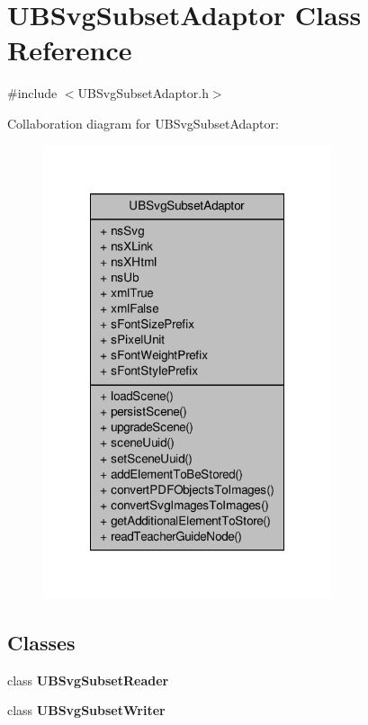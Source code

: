 \hypertarget{class_u_b_svg_subset_adaptor}{\section{U\-B\-Svg\-Subset\-Adaptor Class Reference}
\label{d3/df9/class_u_b_svg_subset_adaptor}
}


{\ttfamily \#include $<$U\-B\-Svg\-Subset\-Adaptor.\-h$>$}



Collaboration diagram for U\-B\-Svg\-Subset\-Adaptor\-:
\nopagebreak
\begin{figure}[H]
\begin{center}
\leavevmode
\includegraphics[width=240pt]{d2/ddc/class_u_b_svg_subset_adaptor__coll__graph}
\end{center}
\end{figure}
\subsection*{Classes}
\begin{DoxyCompactItemize}
\item 
class {\bfseries U\-B\-Svg\-Subset\-Reader}
\item 
class {\bfseries U\-B\-Svg\-Subset\-Writer}
\end{DoxyCompactItemize}
